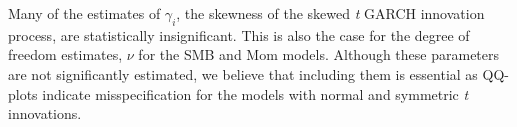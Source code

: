 

Many of the estimates of $\gamma_i$, the skewness of the skewed \emph{t} GARCH innovation process, are statistically insignificant. This is also the case for the degree of freedom estimates, $\nu$ for the SMB and Mom models. Although these parameters are not significantly estimated, we believe that including them is essential as QQ-plots indicate misspecification for the models with normal and symmetric \emph{t} innovations.


